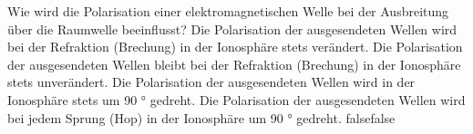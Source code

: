     {Wie wird die Polarisation einer elektromagnetischen Welle bei der Ausbreitung über die Raumwelle beeinflusst?}
    {Die Polarisation der ausgesendeten Wellen wird bei der Refraktion (Brechung) in der Ionosphäre stets verändert.}
    {Die Polarisation der ausgesendeten Wellen bleibt bei der Refraktion (Brechung) in der Ionosphäre stets unverändert.}
    {Die Polarisation der ausgesendeten Wellen wird in der Ionosphäre stets um 90 ° gedreht.}
    {Die Polarisation der ausgesendeten Wellen wird bei jedem Sprung (Hop) in der Ionosphäre um 90 ° gedreht.}
    {false}{false}